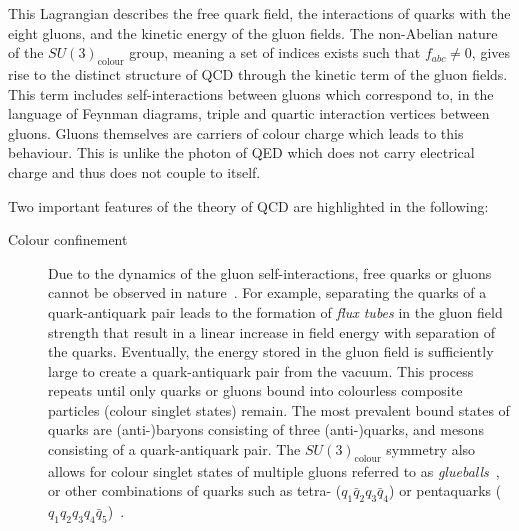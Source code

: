 This Lagrangian describes the free quark field, the interactions of quarks with
the eight gluons, and the kinetic energy of the gluon fields. The non-Abelian
nature of the $SU(3)_{\text{colour}}$ group, meaning a set of indices exists
such that $f_{abc} \neq 0$, gives rise to the distinct structure of QCD through
the kinetic term of the gluon fields. This term includes self-interactions
between gluons which correspond to, in the language of Feynman diagrams, triple
and quartic interaction vertices between gluons. Gluons themselves are carriers
of colour charge which leads to this behaviour. This is unlike the photon of QED
which does not carry electrical charge and thus does not couple to itself.

Two important features of the theory of QCD are highlighted in the following:
\begin{description}

\item[Colour confinement] Due to the dynamics of the gluon self-interactions,
  free quarks or gluons cannot be observed in nature~\cite{Wilson:1974sk}. For
  example, separating the quarks of a quark-antiquark pair leads to the
  formation of \emph{flux tubes} in the gluon field strength that result in a
  linear increase in field energy with separation of the quarks. Eventually, the
  energy stored in the gluon field is sufficiently large to create a
  quark-antiquark pair from the vacuum. This process repeats until only quarks
  or gluons bound into colourless composite particles (colour singlet states)
  remain. The most prevalent bound states of quarks are (anti-)baryons
  consisting of three (anti-)quarks, and mesons consisting of a quark-antiquark
  pair. The $SU(3)_{\text{colour}}$ symmetry also allows for colour singlet
  states of multiple gluons referred to as
  \emph{glueballs}~\cite{Fritzsch:1972jv,Fritzsch:1975tx}, or other combinations
  of quarks such as tetra- ($q_1 \bar{q}_2 q_3 \bar{q}_4$) or pentaquarks
  ($q_1 q_2 q_3 q_4 \bar{q}_5$)~\cite{Gell-Mann:1964ewy}.


\end{description}
